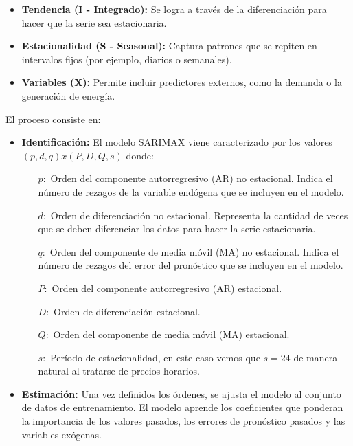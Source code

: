 \begin{itemize}
    \item \textbf{Tendencia (I - Integrado):} Se logra a través de la diferenciación para hacer que la serie sea estacionaria.
    \item \textbf{Estacionalidad (S - Seasonal):} Captura patrones que se repiten en intervalos fijos (por ejemplo, diarios o semanales).
    \item \textbf{Variables (X):} Permite incluir predictores externos, como la demanda o la generación de energía.
\end{itemize}

El proceso consiste en:
\begin{itemize}
    \item \textbf{Identificación:} El modelo SARIMAX viene caracterizado por los valores $(p,d,q)x(P,D,Q,s)$ donde:
        \begin{itemize}
        \item[$p:$] Orden del componente autorregresivo (AR) no estacional. Indica el número de rezagos de la variable endógena que se incluyen en el modelo.
        \item[$d:$] Orden de diferenciación no estacional. Representa la cantidad de veces que se deben diferenciar los datos para hacer la serie estacionaria.
        \item[$q:$] Orden del componente de media móvil (MA) no estacional. Indica el número de rezagos del error del pronóstico que se incluyen en el modelo.
        \item[$P:$] Orden del componente autorregresivo (AR) estacional.
        \item[$D:$] Orden de diferenciación estacional.
        \item[$Q:$] Orden del componente de media móvil (MA) estacional.
        \item[$s:$] Período de estacionalidad, en este caso vemos que $s=24$ de manera natural al tratarse de precios horarios.
    \end{itemize}
    
    \item \textbf{Estimación:} Una vez definidos los órdenes, se ajusta el modelo al conjunto de datos de entrenamiento. El modelo aprende los coeficientes que ponderan la importancia de los valores pasados, los errores de pronóstico pasados y las variables exógenas.
\end{itemize}

